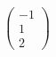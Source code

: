 \documentclass[preview]{standalone}
\begin{document}
\begin{align*}
\begin{pmatrix} -1 \\ 1 \\ 2 \end{pmatrix}
\end{align*}
\end{document}

